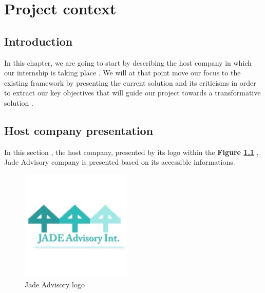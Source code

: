 \chapter{Project context}

\section{Introduction}
In this chapter, we are going to start by describing the host company in which our internship is taking place . We will at that point move our focus to the existing framework by presenting the current solution and its criticisms in order to extract our key objectives that will guide our project towards a transformative solution .
\section{Host company presentation}
In this section , the host company, presented by its logo within the \textbf{Figure \ref{fig0} } \cite{w1}, Jade Advisory company is presented based on its accessible informations.
\begin{figure}[h]
    \centering
    \includegraphics[width=0.3 \linewidth]{assets/jade_advisory.jpg}
    \caption{Jade Advisory logo}
    \label{fig0}
\end{figure}

